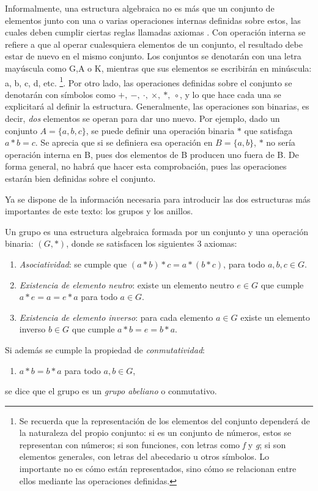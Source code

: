 Informalmente, una estructura algebraica no es más que un conjunto de elementos junto con una o varias operaciones internas definidas sobre estos, las cuales deben cumplir ciertas reglas llamadas axiomas \cite[p.~1]{Rosenberger}. Con operación interna se refiere a que al operar cualesquiera elementos de un conjunto, el resultado debe estar de nuevo en el mismo conjunto. Los conjuntos se denotarán con una letra mayúscula como G,A o K, mientras que sus elementos se escribirán en minúscula: a, b, c, d, etc.
\footnote{Se recuerda que la representación de los elementos del conjunto dependerá de la naturaleza del propio conjunto: si es un conjunto de números, estos se representan con números; si son funciones, con letras como \textit{f} y \textit{g}; si son elementos generales, con letras del abecedario u otros símbolos. Lo importante no es cómo están representados, sino cómo se relacionan entre ellos mediante las operaciones definidas.}.
Por otro lado, las operaciones definidas sobre el conjunto se denotarán con símbolos como $+,\ -,\ \cdot,\ \times,\ \ast, \ \circ$, y lo que hace cada una se explicitará al definir la estructura. Generalmente, las operaciones son binarias, es decir, \textit{dos} elementos se operan para dar uno nuevo. Por ejemplo, dado un conjunto $A = \{a,b, c\}$, se puede definir una operación binaria $\ast$ que satisfaga $a \ast b = c$. Se aprecia que si se definiera esa operación en $B = \{a,b\}$, $\ast$ no sería operación interna en B, pues dos elementos de B producen uno fuera de B. De forma general, no habrá que hacer esta comprobación, pues las operaciones estarán bien definidas sobre el conjunto.\bigskip

Ya se dispone de la información necesaria para introducir las dos estructuras más importantes de este texto: los grupos y los anillos.

\begin{deff}[Grupo]{\cite[p.~17]{GruposBujalance}}
     Un grupo es una estructura algebraica formada por un conjunto y una operación binaria: $(G,\ast)$, donde se satisfacen los siguientes 3 axiomas:
     
    \begin{enumerate}[label=\roman*)]
        \item \textit{Asociatividad}: se cumple que $ (a \ast b) \ast c = a \ast (b \ast c)$, para todo $a,b,c\in G$.
        \item \textit{Existencia de elemento neutro}: existe un elemento neutro $e \in G$ que cumple $a \ast e = a = e \ast a $ para todo $a \in G$.
        \item \textit{Existencia de elemento inverso}: para cada elemento $a \in G$ existe un elemento inverso $b \in G$ que cumple $ a \ast b  = e = b \ast a$.
    \end{enumerate}
    Si además se cumple la propiedad de \textit{conmutatividad}:
    \begin{enumerate}[label=iv)]
        \item $ a \ast b  = b \ast a$ para todo  $a,b \in G$,
    \end{enumerate}
    se dice que el grupo es un \textit{grupo abeliano} o conmutativo.
\end{deff}

